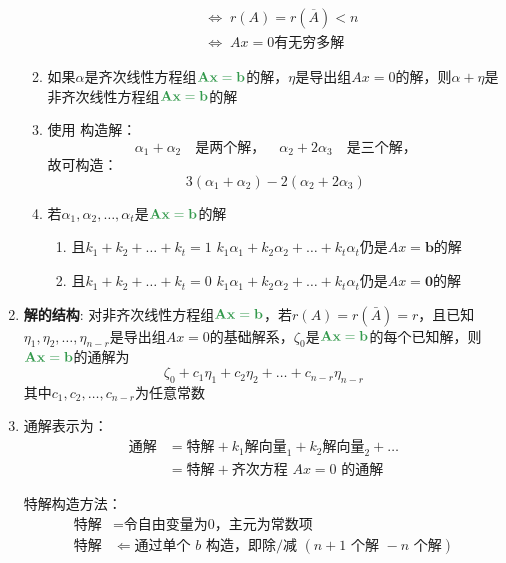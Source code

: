 \documentclass[a4paper,12pt]{article}
\begin{document}
\begin{enumerate}
\begin{enumerate}
\begin{align*}
                &\Leftrightarrow\; r(A) = r(\overline{A}) < n  \\
                &\Leftrightarrow\; Ax = 0\text{有无穷多解}
            \end{align*}
            \item 如果$\alpha$是齐次线性方程组$\mathbf{\color[rgb]{0.2, 0.6, 0.3}{Ax = b}}$的解，$\eta$是导出组$Ax = 0$的解，则$\alpha + \eta$是非齐次线性方程组$\mathbf{\color[rgb]{0.2, 0.6, 0.3}{Ax = b}}$的解
            \item 使用 \textbf{\color{red}{最小公约数}} 构造解：
            \[
                \alpha_1 + \alpha_2 \quad \text{是两个解，} \quad
                \alpha_2 + 2\alpha_3 \quad \text{是三个解，}
            \]
            故可构造：
            \[
                3(\alpha_1 + \alpha_2) - 2(\alpha_2 + 2\alpha_3)
            \]
            \item 若$\alpha_1,\alpha_2,\dots,\alpha_t$是$\mathbf{\color[rgb]{0.2, 0.6, 0.3}{Ax = b}}$的解
            \begin{enumerate}
                \item 且$k_1 + k_2 + \dots + k_t = 1$ \Leftrightarrow $k_{1}\alpha_1 + k_{2}\alpha_2 + \dots + k_{t}\alpha_t$仍是$Ax = \mathbf{b}$的解
                \item 且$k_1 + k_2 + \dots + k_t = 0$ \Leftrightarrow $k_{1}\alpha_1 + k_{2}\alpha_2 + \dots + k_{t}\alpha_t$仍是$Ax = \mathbf{0}$的解
            \end{enumerate}
        \end{enumerate}
        \item \textbf{解的结构}: 对非齐次线性方程组$\mathbf{\color[rgb]{0.2, 0.6, 0.3}{Ax = b}}$，若$r(A) = r(\bar{A}) = r$，且已知$\eta_1, \eta_2, \dots, \eta_{n - r}$是导出组$Ax = 0$的基础解系，$\zeta_0$是$\mathbf{\color[rgb]{0.2, 0.6, 0.3}{Ax = b}}$的每个已知解，则$\mathbf{\color[rgb]{0.2, 0.6, 0.3}{Ax = b}}$的通解为
        \[
            \zeta_0 + c_{1}\eta_1 + c_{2}\eta_2 + \dots + c_{n-r}\eta_{n-r}
        \]其中$c_1, c_2, \dots, c_{n-r}$为任意常数
        \item 通解表示为：
        \[
            \begin{aligned}
                \text{通解}
                &= \text{特解} + k_1 \text{解向量}_1 + k_2 \text{解向量}_2 + \dots \\
                &= \text{特解} + \text{齐次方程 } Ax = 0 \text{ 的通解}
            \end{aligned}
        \]

        特解构造方法：
        \[
            \begin{aligned}
                \text{特解} &= \text{令自由变量为0，主元为常数项} \\
                \text{特解} &\Leftarrow \text{通过单个 } b \text{ 构造，即除/减 } (n+1 \text{ 个解 } - n \text{ 个解})
            \end{aligned}
        \]


\end{enumerate}
\end{document}
